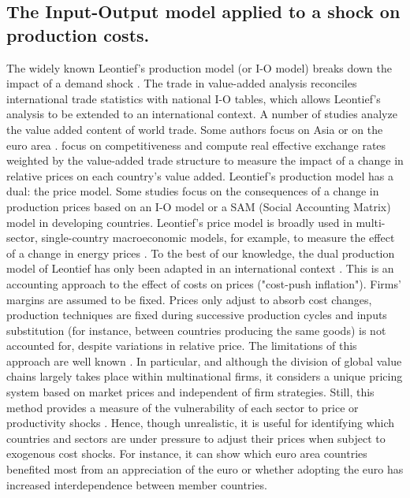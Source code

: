 \documentclass[11pt,a4paper]{article}
\begin{document}
\subsection{The Input-Output model applied to a shock on production costs.}
\label{subsec:io}
The widely known Leontief's production model (or I-O model) breaks down the impact of a demand shock \citep{LeontiefstructureAmericaneconomy1951}. The trade in value-added analysis reconciles international trade statistics with national I-O tables, which allows Leontief's analysis to be extended to an international context. A number of studies \citep{HummelsVerticalSpecializationWorldTrade2001,Daudincommerceexterieurvaleur2006,DaudinWhoproduceswhom2011, DeBackerInternationalComparativeEvidence2012,JohnsonAccountingintermediatesProduction2012,KoopmanTracingvalueaddeddouble2014, AmadorGlobalvaluechains2015,LosComment2016} analyze the value added content of world trade. Some authors focus on Asia \citep{Sato2014} or on the euro area \citep{CapparielloHowdoesforeign2015}. \cite{BemsDemandValueAdded2015} focus on competitiveness and compute real effective exchange rates weighted by the value-added trade structure to measure the impact of a change in relative prices on each country's value added.
Leontief's production model has a dual: the price model. Some studies focus on the consequences of a change in production prices based on an I-O model or a SAM (Social Accounting Matrix) model in developing countries. Leontief's price model is broadly used in multi-sector, single-country macroeconomic models, for example, to measure the effect of a change in energy prices \citep{Bournaycomptabilitenationale2015,Sharify2013}. To the best of our knowledge, the dual production model of Leontief has only been adapted in an international context \cite{Cochard2016}. 
This is an accounting approach to the effect of costs on prices ("cost-push inflation"). Firms' margins are assumed to be fixed. Prices only adjust to absorb cost changes, production techniques are fixed during successive production cycles and inputs substitution (for instance, between countries producing the same goods) is not accounted for, despite variations in relative price. The limitations of this approach are well known \citep{Folloni1994}. In particular, and although the division of global value chains largely takes place within multinational firms, it considers a unique pricing system based on market prices and independent of firm strategies. Still, this method provides a measure of the vulnerability of each sector to price or productivity shocks \citep{AcemogluNetworkOriginsAggregate2012,Carvalhomicromacroproduction2014}. Hence, though unrealistic, it is useful for identifying which countries and sectors are under pressure to adjust their prices when subject to exogenous cost shocks. For instance, it can show which euro area countries benefited most from an appreciation of the euro or whether adopting the euro has increased interdependence between member countries.
\end{document}
